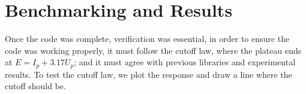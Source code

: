\documentclass[11pt,a4paper]{report}
\begin{document}
\section{Benchmarking and Results}
Once the code was complete, verification was essential, in order to ensure the code was working properly, it must follow the cutoff law, where the plateau ends at $E = I_p + 3.17U_p$; and it must agree with previous libraries and experimental results. To test the cutoff law, we plot the response and draw a line where the cutoff should be.


\printbibliography
\end{document}
